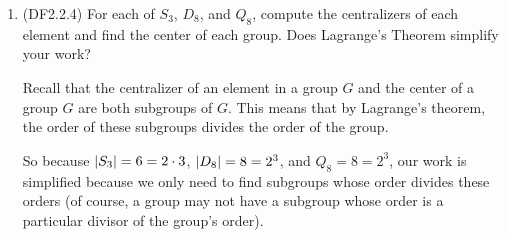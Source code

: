 \documentclass[11pt]{article}
\begin{document}
\begin{enumerate}
    \item (DF2.2.4) For each of $S_3$, $D_8$, and $Q_8$, compute the centralizers of each element and find the center of each group. Does Lagrange's Theorem simplify your work?
    
    Recall that the centralizer of an element in a group $G$ and the center of a group $G$ are both subgroups of $G$. This means that by Lagrange's theorem, the order of these subgroups divides the order of the group.
    
    So because $\abs{S_3} = 6 = 2\cdot 3$, $\abs{D_8} = 8 = 2^3$, and $Q_8 = 8 = 2^3$, our work is simplified because we only need to find subgroups whose order divides these orders (of course, a group may not have a subgroup whose order is a particular divisor of the group's order).


\end{enumerate}
\end{document}
